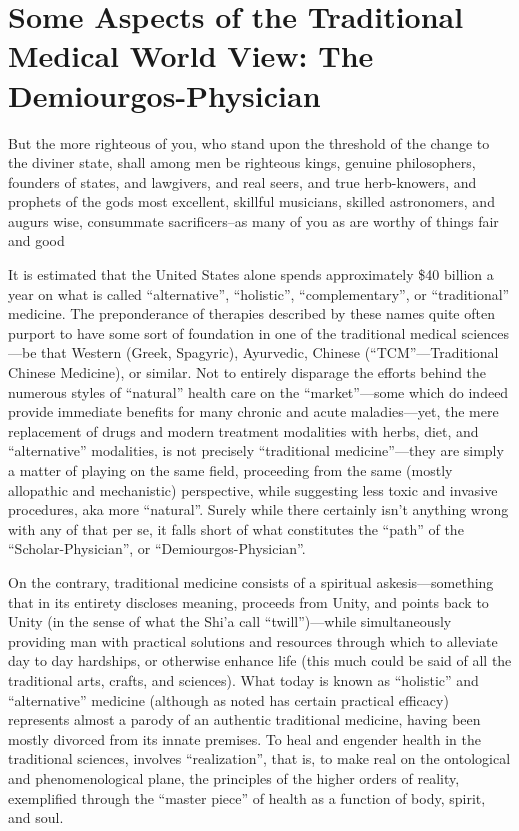 \section[Some Aspects of the Traditional Medical World View]{Some Aspects of the Traditional Medical World View: The Demiourgos-Physician}

\begin{quotex}
But the more righteous of you, who stand upon the threshold of the change to the diviner state, shall among men be righteous kings, genuine philosophers, founders of states, and lawgivers, and real seers, and true herb-knowers, and prophets of the gods most excellent, skillful musicians, skilled astronomers, and augurs wise, consummate sacrificers--as many of you as are worthy of things fair and good 
\end{quotex}


It is estimated that the United States alone spends approximately \$40 billion a year on what is called ``alternative'', ``holistic'', ``complementary'', or ``traditional'' medicine. The preponderance of therapies described by these names quite often purport to have some sort of foundation in one of the traditional medical sciences---be that Western (Greek, Spagyric), Ayurvedic, Chinese (``TCM''---Traditional Chinese Medicine), or similar. Not to entirely disparage the efforts behind the numerous styles of ``natural'' health care on the ``market''---some which do indeed provide immediate benefits for many chronic and acute maladies---yet, the mere replacement of drugs and modern treatment modalities with herbs, diet, and ``alternative'' modalities, is not precisely ``traditional medicine''---they are simply a matter of playing on the same field, proceeding from the same (mostly allopathic and mechanistic) perspective, while suggesting less toxic and invasive procedures, aka more ``natural''. Surely while there certainly isn't anything wrong with any of that per se, it falls short of what constitutes the ``path'' of the ``Scholar-Physician'', or ``Demiourgos-Physician''.

On the contrary, traditional medicine consists of a spiritual askesis---something that in its entirety discloses meaning, proceeds from Unity, and points back to Unity (in the sense of what the Shi'a call ``twill'')---while simultaneously providing man with practical solutions and resources through which to alleviate day to day hardships, or otherwise enhance life (this much could be said of all the traditional arts, crafts, and sciences). What today is known as ``holistic'' and ``alternative'' medicine (although as noted has certain practical efficacy) represents almost a parody of an authentic traditional medicine, having been mostly divorced from its innate premises. To heal and engender health in the traditional sciences, involves ``realization'', that is, to make real on the ontological and phenomenological plane, the principles of the higher orders of reality, exemplified through the ``master piece'' of health as a function of body, spirit, and soul.

